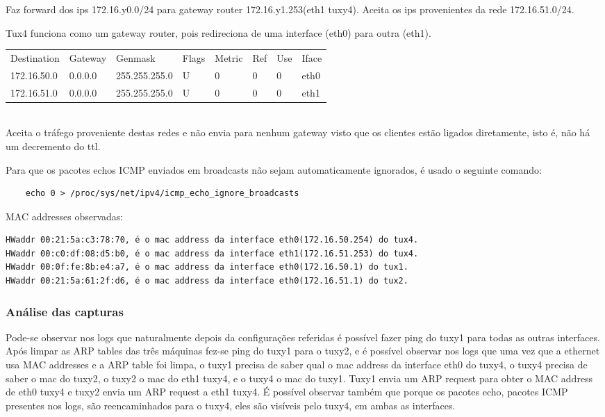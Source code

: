 \documentclass[a4paper]{article}
\begin{document}
Faz forward dos ips 172.16.y0.0/24 para gateway router 172.16.y1.253(eth1 tuxy4). Aceita os ips provenientes da rede 172.16.51.0/24.

Tux4 funciona como um gateway router, pois redireciona de uma interface (eth0) para outra (eth1).

\begin{tabular}{l l l l l l l l}
Destination & Gateway & Genmask & Flags & Metric & Ref & Use & Iface \\
172.16.50.0 & 0.0.0.0 & 255.255.255.0 & U & 0 & 0 & 0 & eth0 \\
172.16.51.0 & 0.0.0.0 & 255.255.255.0 & U & 0 & 0 & 0 & eth1
\end{tabular} \\

Aceita o tráfego proveniente destas redes e não envia para nenhum gateway visto que os clientes
estão ligados diretamente, isto é, não há um decremento do ttl.

Para que os pacotes echos ICMP enviados em broadcasts não sejam automaticamente ignorados, é usado o seguinte comando:
\begin{verbatim}
	echo 0 > /proc/sys/net/ipv4/icmp_echo_ignore_broadcasts
\end{verbatim}

MAC addresses observadas:
\begin{verbatim}
HWaddr 00:21:5a:c3:78:70, é o mac address da interface eth0(172.16.50.254) do tux4.
HWaddr 00:c0:df:08:d5:b0, é o mac address da interface eth1(172.16.51.253) do tux4.
HWaddr 00:0f:fe:8b:e4:a7, é o mac address da interface eth0(172.16.50.1) do tux1.
HWaddr 00:21:5a:61:2f:d6, é o mac address da interface eth0(172.16.51.1) do tux2.
\end{verbatim}

\subsubsection{Análise das capturas}
Pode-se observar nos logs que naturalmente depois da configurações referidas é possível fazer ping do tuxy1 para todas as outras interfaces.
Após limpar as ARP tables das três máquinas fez-se ping do tuxy1 para o tuxy2, e é possível observar nos logs que uma vez que a ethernet usa MAC addresses e a ARP table foi limpa, o tuxy1 precisa de saber qual o mac address da interface eth0 do tuxy4, o tuxy4 precisa de saber o mac do tuxy2, o tuxy2 o mac do eth1 tuxy4, e o tuxy4 o mac do tuxy1. Tuxy1 envia um ARP request para obter o MAC address de eth0 tuxy4 e tuxy2 envia um ARP request a eth1 tuxy4.
É possível observar também que porque os pacotes echo, pacotes ICMP presentes nos logs, são reencaminhados para o tuxy4, eles são visíveis pelo tuxy4, em ambas as interfaces.
\end{document}
